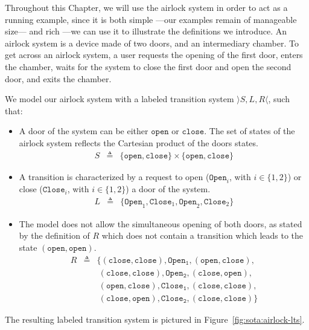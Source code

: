 Throughout this Chapter, we will use the airlock system in order to act as a
running example, since it is both simple ---our examples remain of manageable
size--- and rich ---we can use it to illustrate the definitions we introduce.
%
An airlock system is a device made of two doors, and an intermediary chamber.
%
To get across an airlock system, a user requests the opening of the first door,
enters the chamber, waits for the system to close the first door and open the
second door, and exits the chamber.

\begin{example}
  \label{example:sota:airlocklts}

  We model our airlock system with a labeled transition system
  \( \rangle S, L, R \langle \), such that:

  \begin{itemize}
  \item A door of the system can be either \( \mathtt{open} \) or
    \( \mathtt{close} \).
    The set of states of the airlock system reflects the Cartesian product of
    the doors states.
    \[
      \begin{array}{rcl}
        S & \triangleq & \{ \mathtt{open}, \mathtt{close} \} \times \{ \mathtt{open},
                         \mathtt{close} \}
      \end{array}
    \]
  \item A transition is characterized by a request to open
    (\( \mathtt{Open}_i\), with \( i \in \{1, 2\} \)) or close
    (\( \mathtt{Close}_i \), with \( i \in \{1, 2\} \)) a door of the system.
    \[
      \begin{array}{rcl}
        L & \triangleq & \{ \mathtt{Open}_1, \mathtt{Close}_1, \mathtt{Open}_2,
                         \mathtt{Close}_2 \}
      \end{array}
    \]
  \item The model does not allow the simultaneous opening of both doors, as
    stated by the definition of \( R \) which does not contain a transition
    which leads to the state \( (\mathtt{open}, \mathtt{open}) \).
    \[
      \begin{array}{rcl}
        R & \triangleq & \{ (\mathtt{close}, \mathtt{close}), \mathtt{Open_1},
                         (\mathtt{open}, \mathtt{close}), \\
          & & \ (\mathtt{close}, \mathtt{close}), \mathtt{Open_2},
              (\mathtt{close}, \mathtt{open}), \\
          & & \ (\mathtt{open}, \mathtt{close}), \mathtt{Close_1},
              (\mathtt{close}, \mathtt{close}), \\
          & & \ (\mathtt{close}, \mathtt{open}), \mathtt{Close_2},
              (\mathtt{close}, \mathtt{close}) \}
      \end{array}
    \]
  \end{itemize}

  The resulting labeled transition system is pictured in
  Figure~\ref{fig:sota:airlock-lts}.
\end{example}

